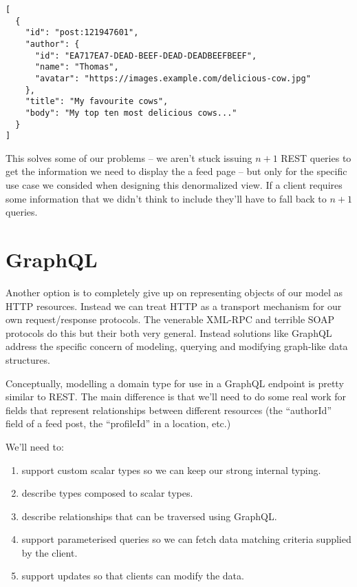 \documentclass[a4paper]{article}
\begin{document}
\begin{verbatim}
[
  {
    "id": "post:121947601",
    "author": {
      "id": "EA717EA7-DEAD-BEEF-DEAD-DEADBEEFBEEF",
      "name": "Thomas",
      "avatar": "https://images.example.com/delicious-cow.jpg"
    },
    "title": "My favourite cows",
    "body": "My top ten most delicious cows..."
  }
]
\end{verbatim}

This solves some of our problems -- we aren't stuck issuing $n+1$ REST queries
to get the information we need to display the a feed page -- but only for the
specific use case we consided when designing this denormalized view. If a client
requires some information that we didn't think to include they'll have to fall
back to $n+1$ queries.

\section{GraphQL}

Another option is to completely give up on representing objects of our model as
HTTP resources. Instead we can treat HTTP as a transport mechanism for our own
request/response protocols. The venerable XML-RPC and terrible SOAP protocols do
this but their both very general. Instead solutions like GraphQL address the
specific concern of modeling, querying and modifying graph-like data structures.

Conceptually, modelling a domain type for use in a GraphQL endpoint is pretty
similar to REST. The main difference is that we'll need to do some real work
for fields that represent relationships between different resources (the
``authorId'' field of a feed post, the ``profileId'' in a location, etc.)

We'll need to:

\begin{enumerate}
  \item support custom scalar types so we can keep our strong internal typing.

  \item describe types composed to scalar types.

  \item describe relationships that can be traversed using GraphQL.
  
  \item support parameterised queries so we can fetch data matching criteria
  supplied by the client.

  \item support updates so that clients can modify the data.
\end{enumerate}
\end{document}
